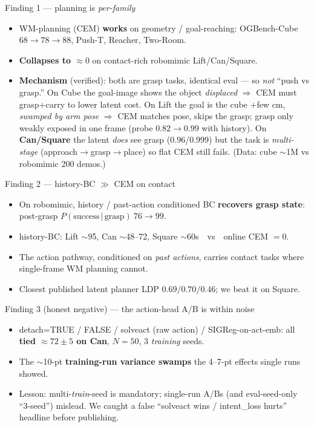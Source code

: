 \documentclass[aspectratio=169,9pt]{beamer}
\begin{document}
\begin{frame}{Finding 1 --- planning is \emph{per-family}}
\begin{itemize}
  \item WM-planning (CEM) \textbf{works} on geometry / goal-reaching: OGBench-Cube $68\!\to\!78\!\to\!88$, Push-T, Reacher, Two-Room.
  \item \textbf{Collapses to $\approx 0$} on contact-rich robomimic Lift/Can/Square.
  \item \textbf{Mechanism} (verified): both are grasp tasks, identical eval --- so \emph{not} ``push vs grasp.'' On Cube the goal-image shows the object \emph{displaced} $\Rightarrow$ CEM must grasp+carry to lower latent cost. On Lift the goal is the cube $+$few cm, \emph{swamped by arm pose} $\Rightarrow$ CEM matches pose, skips the grasp; grasp only weakly exposed in one frame (probe $0.82\!\to\!0.99$ with history). On \textbf{Can/Square} the latent \emph{does} see grasp ($0.96$/$0.999$) but the task is \emph{multi-stage} (approach$\to$grasp$\to$place) so flat CEM still fails. (Data: cube $\sim$1M vs robomimic 200 demos.)
\end{itemize}
\end{frame}

\begin{frame}{Finding 2 --- history-BC $\gg$ CEM on contact}
\begin{itemize}
  \item On robomimic, history / past-action conditioned BC \textbf{recovers grasp state}: post-grasp $P(\text{success}\,|\,\text{grasp})\ 76\!\to\!99$.
  \item history-BC: Lift $\sim$95, Can $\sim$48--72, Square $\sim$60s\ \ vs\ \ online CEM $=0$.
  \item The action pathway, conditioned on \emph{past actions}, carries contact tasks where single-frame WM planning cannot.
  \item Closest published latent planner LDP $0.69/0.70/0.46$; we beat it on Square.
\end{itemize}
\end{frame}

\begin{frame}{Finding 3 (honest negative) --- the action-head A/B is within noise}
\begin{itemize}
  \item detach=TRUE / FALSE / solveact (raw action) / SIGReg-on-act-emb: all \textbf{tied $\approx 72\pm5$ on Can}, $N{=}50$, 3 \emph{training} seeds.
  \item The $\sim$10-pt \textbf{training-run variance swamps} the 4--7-pt effects single runs showed.
  \item Lesson: multi-\emph{train}-seed is mandatory; single-run A/Bs (and eval-seed-only ``3-seed'') mislead. We caught a false ``solveact wins / intent\_loss hurts'' headline before publishing.
\end{itemize}
\end{frame}
\end{document}
